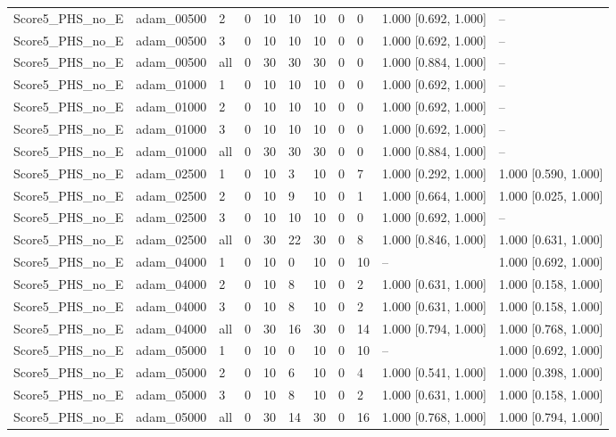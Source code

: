 \begin{longtable}{lllllllllll}
Score5\_PHS\_no\_E & adam\_00500 & 2 & 0 & 10 & 10 & 10 & 0 & 0 & 1.000 [0.692, 1.000] & -- \\
Score5\_PHS\_no\_E & adam\_00500 & 3 & 0 & 10 & 10 & 10 & 0 & 0 & 1.000 [0.692, 1.000] & -- \\
Score5\_PHS\_no\_E & adam\_00500 & all & 0 & 30 & 30 & 30 & 0 & 0 & 1.000 [0.884, 1.000] & -- \\
Score5\_PHS\_no\_E & adam\_01000 & 1 & 0 & 10 & 10 & 10 & 0 & 0 & 1.000 [0.692, 1.000] & -- \\
Score5\_PHS\_no\_E & adam\_01000 & 2 & 0 & 10 & 10 & 10 & 0 & 0 & 1.000 [0.692, 1.000] & -- \\
Score5\_PHS\_no\_E & adam\_01000 & 3 & 0 & 10 & 10 & 10 & 0 & 0 & 1.000 [0.692, 1.000] & -- \\
Score5\_PHS\_no\_E & adam\_01000 & all & 0 & 30 & 30 & 30 & 0 & 0 & 1.000 [0.884, 1.000] & -- \\
Score5\_PHS\_no\_E & adam\_02500 & 1 & 0 & 10 & 3 & 10 & 0 & 7 & 1.000 [0.292, 1.000] & 1.000 [0.590, 1.000] \\
Score5\_PHS\_no\_E & adam\_02500 & 2 & 0 & 10 & 9 & 10 & 0 & 1 & 1.000 [0.664, 1.000] & 1.000 [0.025, 1.000] \\
Score5\_PHS\_no\_E & adam\_02500 & 3 & 0 & 10 & 10 & 10 & 0 & 0 & 1.000 [0.692, 1.000] & -- \\
Score5\_PHS\_no\_E & adam\_02500 & all & 0 & 30 & 22 & 30 & 0 & 8 & 1.000 [0.846, 1.000] & 1.000 [0.631, 1.000] \\
Score5\_PHS\_no\_E & adam\_04000 & 1 & 0 & 10 & 0 & 10 & 0 & 10 & -- & 1.000 [0.692, 1.000] \\
Score5\_PHS\_no\_E & adam\_04000 & 2 & 0 & 10 & 8 & 10 & 0 & 2 & 1.000 [0.631, 1.000] & 1.000 [0.158, 1.000] \\
Score5\_PHS\_no\_E & adam\_04000 & 3 & 0 & 10 & 8 & 10 & 0 & 2 & 1.000 [0.631, 1.000] & 1.000 [0.158, 1.000] \\
Score5\_PHS\_no\_E & adam\_04000 & all & 0 & 30 & 16 & 30 & 0 & 14 & 1.000 [0.794, 1.000] & 1.000 [0.768, 1.000] \\
Score5\_PHS\_no\_E & adam\_05000 & 1 & 0 & 10 & 0 & 10 & 0 & 10 & -- & 1.000 [0.692, 1.000] \\
Score5\_PHS\_no\_E & adam\_05000 & 2 & 0 & 10 & 6 & 10 & 0 & 4 & 1.000 [0.541, 1.000] & 1.000 [0.398, 1.000] \\
Score5\_PHS\_no\_E & adam\_05000 & 3 & 0 & 10 & 8 & 10 & 0 & 2 & 1.000 [0.631, 1.000] & 1.000 [0.158, 1.000] \\
Score5\_PHS\_no\_E & adam\_05000 & all & 0 & 30 & 14 & 30 & 0 & 16 & 1.000 [0.768, 1.000] & 1.000 [0.794, 1.000] \\

\end{longtable}

